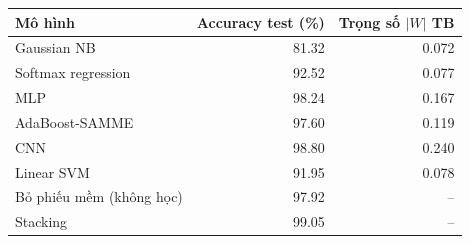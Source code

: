 \begin{tabular}{lrr}
\toprule
Mô hình & Accuracy test (\%) & Trọng số $|W|$ TB \\
\midrule
Gaussian NB & 81.32 & 0.072 \\
Softmax regression & 92.52 & 0.077 \\
MLP & 98.24 & 0.167 \\
AdaBoost-SAMME & 97.60 & 0.119 \\
CNN & 98.80 & 0.240 \\
Linear SVM & 91.95 & 0.078 \\
\midrule
Bỏ phiếu mềm (không học) & 97.92 & -- \\
Stacking & 99.05 & -- \\
\bottomrule
\end{tabular}
